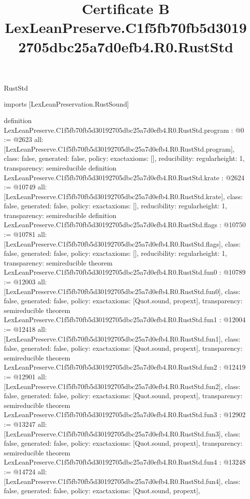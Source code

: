 \begin{lexlean}{RustStd}
\title{Certificate B LexLeanPreserve.C1f5fb70fb5d30192705dbc25a7d0efb4.R0.RustStd}
\begin{coremodule}
imports [LexLeanPreservation.RustSound]

definition LexLeanPreserve.C1f5fb70fb5d30192705dbc25a7d0efb4.R0.RustStd.program : @0 := @2623 {
  all: [LexLeanPreserve.C1f5fb70fb5d30192705dbc25a7d0efb4.R0.RustStd.program],
  class: false,
  generated: false,
  policy: exact{axioms: []},
  reducibility: regular{height: 1},
  transparency: semireducible
}
definition LexLeanPreserve.C1f5fb70fb5d30192705dbc25a7d0efb4.R0.RustStd.krate : @2624 := @10749 {
  all: [LexLeanPreserve.C1f5fb70fb5d30192705dbc25a7d0efb4.R0.RustStd.krate],
  class: false,
  generated: false,
  policy: exact{axioms: []},
  reducibility: regular{height: 1},
  transparency: semireducible
}
definition LexLeanPreserve.C1f5fb70fb5d30192705dbc25a7d0efb4.R0.RustStd.flags : @10750 := @10781 {
  all: [LexLeanPreserve.C1f5fb70fb5d30192705dbc25a7d0efb4.R0.RustStd.flags],
  class: false,
  generated: false,
  policy: exact{axioms: []},
  reducibility: regular{height: 1},
  transparency: semireducible
}
theorem LexLeanPreserve.C1f5fb70fb5d30192705dbc25a7d0efb4.R0.RustStd.fun0 : @10789 := @12003 {
  all: [LexLeanPreserve.C1f5fb70fb5d30192705dbc25a7d0efb4.R0.RustStd.fun0],
  class: false,
  generated: false,
  policy: exact{axioms: [Quot.sound, propext]},
  transparency: semireducible
}
theorem LexLeanPreserve.C1f5fb70fb5d30192705dbc25a7d0efb4.R0.RustStd.fun1 : @12004 := @12418 {
  all: [LexLeanPreserve.C1f5fb70fb5d30192705dbc25a7d0efb4.R0.RustStd.fun1],
  class: false,
  generated: false,
  policy: exact{axioms: [Quot.sound, propext]},
  transparency: semireducible
}
theorem LexLeanPreserve.C1f5fb70fb5d30192705dbc25a7d0efb4.R0.RustStd.fun2 : @12419 := @12901 {
  all: [LexLeanPreserve.C1f5fb70fb5d30192705dbc25a7d0efb4.R0.RustStd.fun2],
  class: false,
  generated: false,
  policy: exact{axioms: [Quot.sound, propext]},
  transparency: semireducible
}
theorem LexLeanPreserve.C1f5fb70fb5d30192705dbc25a7d0efb4.R0.RustStd.fun3 : @12902 := @13247 {
  all: [LexLeanPreserve.C1f5fb70fb5d30192705dbc25a7d0efb4.R0.RustStd.fun3],
  class: false,
  generated: false,
  policy: exact{axioms: [Quot.sound, propext]},
  transparency: semireducible
}
theorem LexLeanPreserve.C1f5fb70fb5d30192705dbc25a7d0efb4.R0.RustStd.fun4 : @13248 := @14724 {
  all: [LexLeanPreserve.C1f5fb70fb5d30192705dbc25a7d0efb4.R0.RustStd.fun4],
  class: false,
  generated: false,
  policy: exact{axioms: [Quot.sound, propext]},
}
\end{coremodule}
\end{lexlean}
